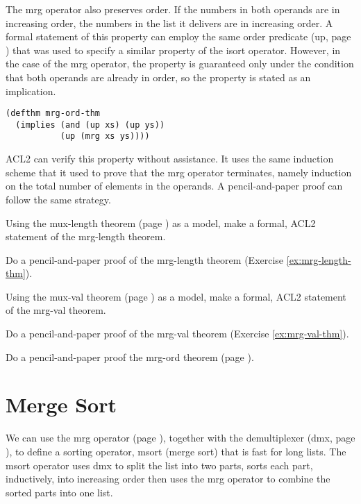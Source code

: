 The mrg operator also preserves order.
If the numbers in both operands are in increasing order,
the numbers in the list it delivers are in increasing order.
A formal statement of this property can employ the same order predicate
(up, page \pageref{defun:up}) that was used to specify a
similar property of the isort operator.
However, in the case of the mrg operator,
the property is guaranteed only under the condition
that both operands are already in order,
so the property is stated as an implication.

\label{defthm:mrg-ord}
\begin{Verbatim}
(defthm mrg-ord-thm
  (implies (and (up xs) (up ys))
           (up (mrg xs ys))))
\end{Verbatim}

ACL2 can verify this property without assistance.
It uses the same induction scheme that it used
to prove that the mrg operator terminates,
namely induction on the total number of elements in the operands.
A pencil-and-paper proof can follow the same strategy.

\begin{ExerciseList}
\Exercise
\label{ex:mrg-length-thm}
Using the mux-length theorem (page \pageref{mux-length-thm})
as a model, make a formal, ACL2 statement of the mrg-length theorem.

\Exercise
Do a pencil-and-paper proof of the mrg-length theorem (Exercise \ref{ex:mrg-length-thm}).

\Exercise
\label{ex:mrg-val-thm}
Using the mux-val theorem (page \pageref{thm:mux-val})
as a model, make a formal, ACL2 statement of the mrg-val theorem.

\Exercise
Do a pencil-and-paper proof of the mrg-val theorem (Exercise \ref{ex:mrg-val-thm}).

\Exercise
Do a pencil-and-paper proof the mrg-ord theorem (page \pageref{defthm:mrg-ord}).
\end{ExerciseList}

\section{Merge Sort}
\label{sec:msort}

We can use the mrg operator (page \pageref{defun:mrg}),
together with the demultiplexer (dmx, page \pageref{dmx-defun}),
to define a sorting operator, msort (merge sort) that is fast for long lists.
The msort operator uses dmx to split the list into two parts,
sorts each part, inductively, into increasing order
then uses the mrg operator to combine the sorted parts into one list.

